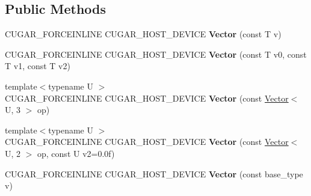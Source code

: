 \subsection*{Public Methods}
\begin{DoxyCompactItemize}
\item 
\mbox{\label{structcugar_1_1_vector_3_01_t_00_013_01_4_a91a2336002431e7d95cc55a531b418eb}} 
C\+U\+G\+A\+R\+\_\+\+F\+O\+R\+C\+E\+I\+N\+L\+I\+NE C\+U\+G\+A\+R\+\_\+\+H\+O\+S\+T\+\_\+\+D\+E\+V\+I\+CE {\bfseries Vector} (const T v)
\item 
\mbox{\label{structcugar_1_1_vector_3_01_t_00_013_01_4_acb9b01720844dbd95c8e2bc0aa31dd88}} 
C\+U\+G\+A\+R\+\_\+\+F\+O\+R\+C\+E\+I\+N\+L\+I\+NE C\+U\+G\+A\+R\+\_\+\+H\+O\+S\+T\+\_\+\+D\+E\+V\+I\+CE {\bfseries Vector} (const T v0, const T v1, const T v2)
\item 
\mbox{\label{structcugar_1_1_vector_3_01_t_00_013_01_4_aa617a12d70503abaa5ee9dac73e9ebdd}} 
{\footnotesize template$<$typename U $>$ }\\C\+U\+G\+A\+R\+\_\+\+F\+O\+R\+C\+E\+I\+N\+L\+I\+NE C\+U\+G\+A\+R\+\_\+\+H\+O\+S\+T\+\_\+\+D\+E\+V\+I\+CE {\bfseries Vector} (const \hyperlink{structcugar_1_1_vector}{Vector}$<$ U, 3 $>$ op)
\item 
\mbox{\label{structcugar_1_1_vector_3_01_t_00_013_01_4_ada51534b8f57f31d449279417c81ce8c}} 
{\footnotesize template$<$typename U $>$ }\\C\+U\+G\+A\+R\+\_\+\+F\+O\+R\+C\+E\+I\+N\+L\+I\+NE C\+U\+G\+A\+R\+\_\+\+H\+O\+S\+T\+\_\+\+D\+E\+V\+I\+CE {\bfseries Vector} (const \hyperlink{structcugar_1_1_vector}{Vector}$<$ U, 2 $>$ op, const U v2=0.\+0f)
\item 
\mbox{\label{structcugar_1_1_vector_3_01_t_00_013_01_4_a6757e0ae6bf1760fa153e4b0df2206a4}} 
C\+U\+G\+A\+R\+\_\+\+F\+O\+R\+C\+E\+I\+N\+L\+I\+NE C\+U\+G\+A\+R\+\_\+\+H\+O\+S\+T\+\_\+\+D\+E\+V\+I\+CE {\bfseries Vector} (const base\+\_\+type v)
\item 
\mbox{\label{structcugar_1_1_vector_3_01_t_00_013_01_4_a70aea0e3424494ac04cab873de632080}} 

\end{DoxyCompactItemize}
